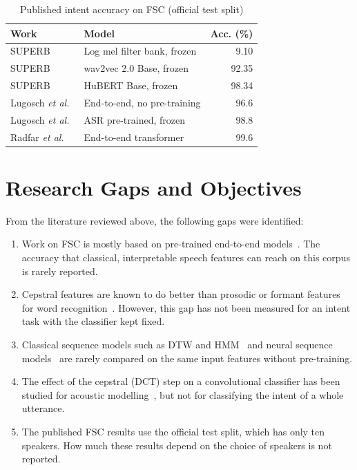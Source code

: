 \documentclass[conference]{IEEEtran}
\begin{document}
\begin{table}[t]
\caption{Published intent accuracy on FSC (official test split)}
\label{tab:lit}
\centering
\footnotesize
\begin{tabular}{@{}llr@{}}
\toprule
Work & Model & Acc. (\%)\\
\midrule
SUPERB~\cite{yang2021superb} & Log mel filter bank, frozen & 9.10\\
SUPERB~\cite{yang2021superb} & wav2vec 2.0 Base, frozen & 92.35\\
SUPERB~\cite{yang2021superb} & HuBERT Base, frozen & 98.34\\
Lugosch \emph{et al.}~\cite{lugosch2019fsc} & End-to-end, no pre-training & 96.6\\
Lugosch \emph{et al.}~\cite{lugosch2019fsc} & ASR pre-trained, frozen & 98.8\\
Radfar \emph{et al.}~\cite{radfar2020transformer} & End-to-end transformer & 99.6\\
\bottomrule
\end{tabular}
\end{table}

\section{Research Gaps and Objectives}\label{sec:gaps}
From the literature reviewed above, the following gaps were identified:
\begin{enumerate}
\item Work on FSC is mostly based on pre-trained end-to-end models~\cite{lugosch2019fsc,radfar2020transformer,yang2021superb}. The accuracy that classical, interpretable speech features can reach on this corpus is rarely reported.
\item Cepstral features are known to do better than prosodic or formant features for word recognition~\cite{davis1980mfcc}. However, this gap has not been measured for an intent task with the classifier kept fixed.
\item Classical sequence models such as DTW and HMM~\cite{sakoe1978dtw,rabiner1989hmm} and neural sequence models~\cite{abdelhamid2014cnn,sainath2015kws} are rarely compared on the same input features without pre-training.
\item The effect of the cepstral (DCT) step on a convolutional classifier has been studied for acoustic modelling~\cite{mohamed2012understanding}, but not for classifying the intent of a whole utterance.
\item The published FSC results use the official test split, which has only ten speakers. How much these results depend on the choice of speakers is not reported.
\end{enumerate}
\end{document}
